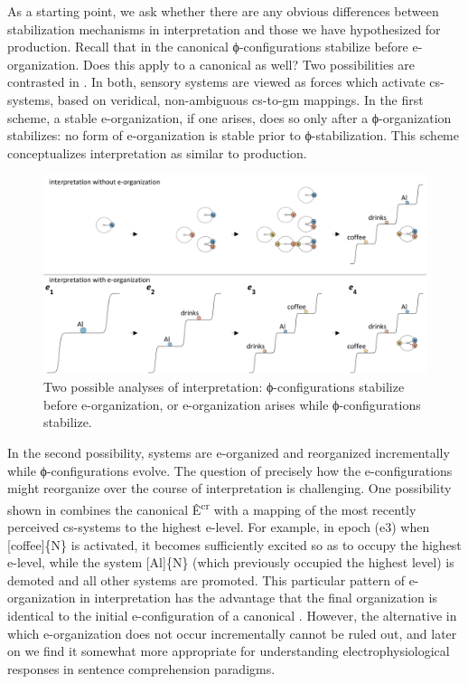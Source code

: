   As a starting point, we ask whether there are any obvious differences between stabilization mechanisms in interpretation and those we have hypothesized for production. Recall that in the canonical  ϕ-con\-fig\-u\-ra\-tions stabilize before e-organization. Does this apply to a canonical  as well? Two possibilities are contrasted in {}. In both, sensory systems are viewed as  forces which activate cs-systems, based on veridical, non-ambiguous cs-to-gm mappings. In the first scheme, a stable e-organization, if one arises, does so only after a ϕ-organization stabilizes: no form of e-organization is stable prior to ϕ-stabilization. This scheme conceptualizes interpretation as similar to production.

  
\begin{figure}
\includegraphics[width=\textwidth]{figures/Tilsen-img90.png}
\caption{Two possible analyses of interpretation: ϕ-con\-fig\-u\-ra\-tions stabilize before e-organization, or e-organization arises while ϕ-con\-fig\-u\-ra\-tions stabilize.}
\label{fig:4:40}
\end{figure}
 

  In the second possibility, systems are e-organized and reorganized incrementally while ϕ-con\-fig\-u\-ra\-tions evolve. The question of precisely how the e-con\-fig\-u\-ra\-tions might reorganize over the course of interpretation is challenging. One possibility shown in {} combines the canonical  Ê\textsuperscript{cr} with a mapping of the most recently perceived cs-systems to the highest e-level. For example, in epoch (e3) when [coffee]\{N\} is activated, it becomes sufficiently excited so as to occupy the highest e-level, while the system [Al]\{N\} (which previously occupied the highest level) is demoted and all other systems are promoted. This particular pattern of e-organization in interpretation has the advantage that the final organization is identical to the initial e-con\-fig\-u\-ra\-tion of a canonical . However, the alternative in which e-or\-ga\-ni\-za\-tion does not occur incrementally cannot be ruled out, and later on we find it somewhat more appropriate for understanding electrophysiological responses in sentence comprehension paradigms.

